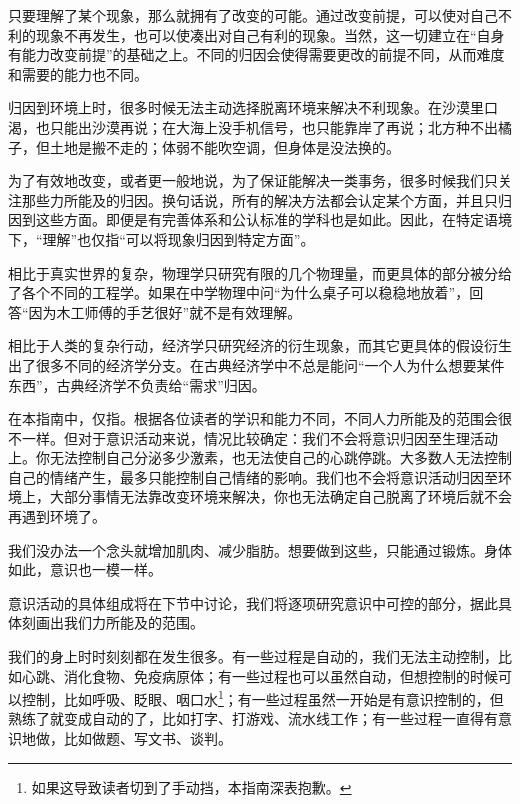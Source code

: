只要理解了某个现象，那么就拥有了改变的可能。通过改变前提，可以使对自己不利的现象不再发生，也可以使凑出对自己有利的现象。当然，这一切建立在“自身有能力改变前提”的基础之上。不同的归因会使得需要更改的前提不同，从而难度和需要的能力也不同。
\begin{examples}
归因到环境上时，很多时候无法主动选择脱离环境来解决不利现象。在沙漠里口渴，也只能出沙漠再说；在大海上没手机信号，也只能靠岸了再说；北方种不出橘子，但土地是搬不走的；体弱不能吹空调，但身体是没法换的。
\end{examples}
为了有效地改变，或者更一般地说，为了保证能解决一类事务，很多时候我们只关注那些力所能及的归因。换句话说，所有的解决方法都会认定某个方面，并且只归因到这些方面。即便是有完善体系和公认标准的学科也是如此。因此，在特定语境下，“理解”也仅指“可以将现象归因到特定方面”。
\begin{examples}
相比于真实世界的复杂，物理学只研究有限的几个物理量，而更具体的部分被分给了各个不同的工程学。如果在中学物理中问“为什么桌子可以稳稳地放着”，回答“因为木工师傅的手艺很好”就不是有效理解。

相比于人类的复杂行动，经济学只研究经济的衍生现象，而其它更具体的假设衍生出了很多不同的经济学分支。在古典经济学中不总是能问“一个人为什么想要某件东西”，古典经济学不负责给“需求”归因。
\end{examples}
在本指南中，仅指。根据各位读者的学识和能力不同，不同人力所能及的范围会很不一样。但对于意识活动来说，情况比较确定：我们不会将意识归因至生理活动上。你无法控制自己分泌多少激素，也无法使自己的心跳停跳。大多数人无法控制自己的情绪产生，最多只能控制自己情绪的影响。我们也不会将意识活动归因至环境上，大部分事情无法靠改变环境来解决，你也无法确定自己脱离了环境后就不会再遇到环境了。
\begin{examples}
我们没办法一个念头就增加肌肉、减少脂肪。想要做到这些，只能通过锻炼。身体如此，意识也一模一样。
\end{examples}
意识活动的具体组成将在下节中讨论，我们将逐项研究意识中可控的部分，据此具体刻画出我们力所能及的范围。

我们的身上时时刻刻都在发生很多。有一些过程是自动的，我们无法主动控制，比如心跳、消化食物、免疫病原体；有一些过程也可以虽然自动，但想控制的时候可以控制，比如呼吸、眨眼、咽口水\footnote{如果这导致读者切到了手动挡，本指南深表抱歉。}；有一些过程虽然一开始是有意识控制的，但熟练了就变成自动的了，比如打字、打游戏、流水线工作；有一些过程一直得有意识地做，比如做题、写文书、谈判。

